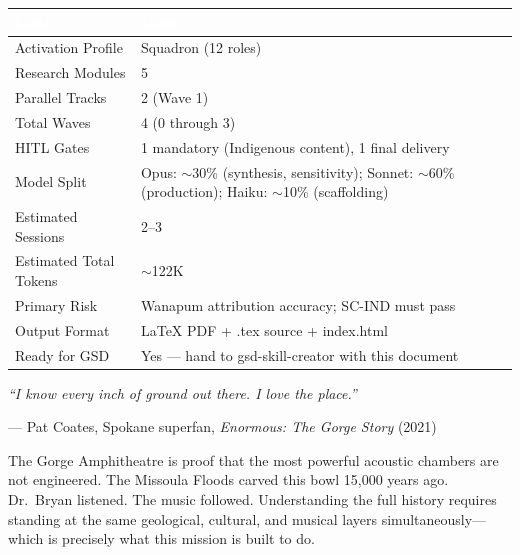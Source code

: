 \documentclass[11pt,letterpaper]{article}
\newcommand{\tableheader}[1]{\textbf{\sffamily\textcolor{white}{#1}}}
\begin{document}
\begin{center}
\begin{tabularx}{\textwidth}{L{5cm}X}
\toprule
{}
\tableheader{Metric} & \tableheader{Value} \\
\midrule
Activation Profile & Squadron (12 roles) \\
Research Modules & 5 \\
Parallel Tracks & 2 (Wave 1) \\
Total Waves & 4 (0 through 3) \\
HITL Gates & 1 mandatory (Indigenous content), 1 final delivery \\
Model Split & Opus: $\sim$30\% (synthesis, sensitivity); Sonnet: $\sim$60\% (production); Haiku: $\sim$10\% (scaffolding) \\
Estimated Sessions & 2--3 \\
Estimated Total Tokens & $\sim$122K \\
Primary Risk & Wanapum attribution accuracy; SC-IND must pass \\
Output Format & LaTeX PDF + .tex source + index.html \\
Ready for GSD & Yes --- hand to gsd-skill-creator with this document \\
\bottomrule
\end{tabularx}
\end{center}

\vspace{2em}

\begin{quotebox}
\textit{``I know every inch of ground out there. I love the place.''}

\hfill --- Pat Coates, Spokane superfan, \textit{Enormous: The Gorge Story} (2021)

\vspace{1em}
\small\sffamily\textcolor{subtlegray}{The Gorge Amphitheatre is proof that the most powerful acoustic chambers are not engineered. The Missoula Floods carved this bowl 15,000 years ago. Dr.\ Bryan listened. The music followed. Understanding the full history requires standing at the same geological, cultural, and musical layers simultaneously---which is precisely what this mission is built to do.}
\end{quotebox}
\end{document}

